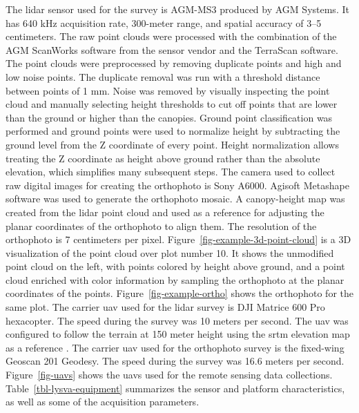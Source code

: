 The \gls{lidar} sensor used for the survey is AGM-MS3 produced by AGM Systems.
It has 640 kHz acquisition rate, 300-meter range, and spatial accuracy of 3–5 centimeters.
The raw point clouds were processed with the combination of the AGM ScanWorks software from the sensor vendor and the TerraScan software.
The point clouds were preprocessed by removing duplicate points and high and low noise points.
The duplicate removal was run with a threshold distance between points of 1 mm.
Noise was removed by visually inspecting the point cloud and manually selecting height thresholds to cut off points that are lower than the ground or higher than the canopies.
Ground point classification was performed and ground points were used to normalize height by subtracting the ground level from the Z coordinate of every point.
Height normalization allows treating the Z coordinate as height above ground rather than the absolute elevation, which simplifies many subsequent steps.
The camera used to collect raw digital images for creating the orthophoto is Sony A6000.
Agisoft Metashape software was used to generate the orthophoto mosaic.
A canopy-height map was created from the \gls{lidar} point cloud and used as a reference for adjusting the planar coordinates of the orthophoto to align them.
The resolution of the orthophoto is 7 centimeters per pixel.
Figure~\ref{fig-example-3d-point-cloud} is a 3D visualization of the point cloud over plot number 10.
It shows the unmodified point cloud on the left, with points colored by height above ground, and a point cloud enriched with color information by sampling the orthophoto at the planar coordinates of the points.
Figure~\ref{fig-example-ortho} shows the orthophoto for the same plot.
The carrier \gls{uav} used for the \gls{lidar} survey is DJI Matrice 600 Pro hexacopter.
The speed during the survey was 10 meters per second.
The \gls{uav} was configured to follow the terrain at 150 meter height using the \gls{srtm} elevation map as a reference \citep{farrShuttleRadarTopography2000}.
The carrier \gls{uav} used for the orthophoto survey is the fixed-wing Geoscan 201 Geodesy.
The speed during the survey was 16.6 meters per second.
Figure~\ref{fig-uavs} shows the \glspl{uav} used for the remote sensing data collections.
Table~\ref{tbl-lysva-equipment} summarizes the sensor and platform characteristics, as well as some of the acquisition parameters.

